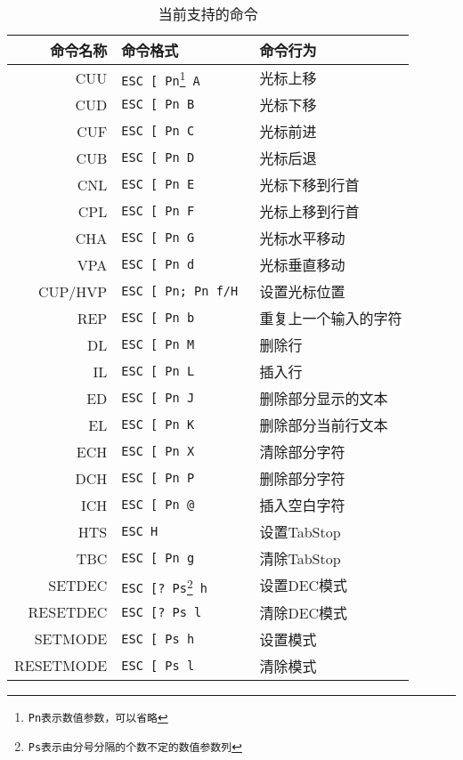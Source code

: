 \begin{longtable}{|r|l|l|}
	\caption{当前支持的命令}
\label{tab:supported-commands} \\

\hline
\textbf{命令名称} & \textbf{命令格式} & \textbf{命令行为} \\ \hline
CUU & \texttt{ESC [ Pn\footnote{Pn表示数值参数，可以省略} A} & 光标上移\\ \hline
CUD & \texttt{ESC [ Pn B }& 光标下移\\ \hline
CUF & \texttt{ESC [ Pn C }& 光标前进\\ \hline
CUB & \texttt{ESC [ Pn D }& 光标后退\\ \hline
CNL & \texttt{ESC [ Pn E }& 光标下移到行首\\ \hline
CPL & \texttt{ESC [ Pn F }& 光标上移到行首\\ \hline
CHA & \texttt{ESC [ Pn G }& 光标水平移动\\ \hline
VPA & \texttt{ESC [ Pn d }& 光标垂直移动\\ \hline
CUP/HVP & \texttt{ESC [ Pn; Pn f/H }& 设置光标位置\\ \hline \hline

REP & \texttt{ESC [ Pn b }& 重复上一个输入的字符 \\ \hline
DL & \texttt{ESC [ Pn M }&删除行 \\ \hline
IL & \texttt{ESC [ Pn L }&插入行 \\ \hline
ED &\texttt{ESC [ Pn J }&删除部分显示的文本 \\ \hline
EL &\texttt{ESC [ Pn K }&删除部分当前行文本 \\ \hline
ECH & \texttt{ESC [ Pn X }&清除部分字符 \\ \hline
DCH & \texttt{ESC [ Pn P }&删除部分字符 \\ \hline
ICH & \texttt{ESC [ Pn @ }&插入空白字符 \\ \hline \hline

HTS & \texttt{ESC H }& 设置TabStop \\ \hline
TBC & \texttt{ESC [ Pn g }& 清除TabStop \\ \hline \hline

SETDEC & \texttt{ESC [? Ps\footnote{Ps表示由分号分隔的个数不定的数值参数列} h }& 设置DEC模式 \\ \hline
RESETDEC & \texttt{ESC [? Ps l }& 清除DEC模式 \\ \hline
SETMODE &\texttt{ESC [ Ps h }& 设置模式 \\ \hline
RESETMODE & \texttt{ESC [ Ps l }&清除模式 \\ \hline \hline


\end{longtable}
